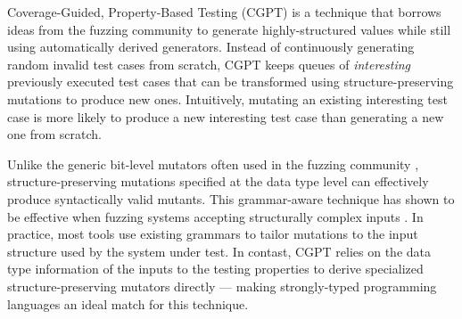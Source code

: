 \documentclass[sigconf,review,anonymous]{acmart}
\newcommand{\quickcheck}{\textit{QuickCheck}\xspace}
\newcommand{\quickchick}{\textit{QuickChick}\xspace}
\newcommand{\fuzzchick}{\textit{FuzzChick}\xspace}
\begin{document}
%
Coverage-Guided, Property-Based Testing (CGPT) \cite{lampropoulos2019coverage}
is a technique that borrows ideas from the fuzzing community to generate
highly-structured values while still using automatically derived generators.
%
%
Instead of continuously generating random invalid test cases from scratch, CGPT
keeps queues of \emph{interesting} previously executed test cases that can be
transformed using structure-preserving mutations to produce new ones.
%
%
Intuitively, mutating an existing interesting test case is more likely to
produce a new interesting test case than generating a new one from scratch.


Unlike the generic bit-level mutators often used in the fuzzing community
\cite{zzuf,radamsa}, structure-preserving mutations specified at the data type
level can effectively produce syntactically valid mutants. 
%
%
This grammar-aware technique has shown to be effective when fuzzing systems
accepting structurally complex inputs \cite{holler2012fuzzing, wang2019superion,
xsmith}.
%
In practice, most tools use existing grammars to tailor mutations to the input
structure used by the system under test. 
%
%
%
%
In contast, CGPT relies on the data type information of the inputs to the
testing properties to derive specialized structure-preserving mutators directly
--- making strongly-typed programming languages an ideal match for this
technique.
%
%
%
%
\end{document}
